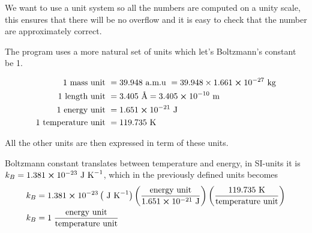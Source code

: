 \documentclass[11pt]{article}
\begin{document}
	We want to use a unit system so all the numbers are computed on a unity scale, this ensures that there will be no overflow and it is easy to check that the number are approximately correct.


		The program uses a more natural set of units which let's Boltzmann's constant be 1.

		\begin{align}
			1 \text{ mass unit } &=   39.948 \text{ a.m.u } =  39.948\times 1.661\cross 10^{-27} \text{ kg}
			\\
			1 \text{ length unit } &= 3.405 \text{ \AA} = 3.405\cross 10^{-10} \text{ m}
			\\
			1 \text{ energy unit } &= 1.651 \cross 10^{-21} \text{ J}
			\\
			1 \text{ temperature unit } &= 119.735 \text{ K}
		\end{align}


	All the other units are then expressed in term of these units.

	Boltzmann constant translates between temperature and energy, in SI-units it is \( k_B = 1.381 \cross 10^{-23} \text{ J K}^{-1}\), which in the previously defined units becomes
	\begin{align}
	k_B &= 1.381 \cross 10^{-23}  \left(\text{ J K}^{-1}\right)  \left(\frac{\text{energy unit}}{1.651 \cross 10^{-21} \text{ J}}\right)
	\left( \frac{119.735 \text{ K}}{\text{temperature unit}} \right)
	\\
	k_B &= 1 \; \frac{\text{energy unit}}{\text{temperature unit}}
	\end{align}

































\end{document}
